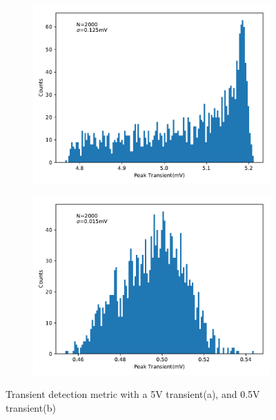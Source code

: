 \begin{figure}[h]
    \centering
    \begin{subfigure}{.5\textwidth}
        \centering
        \includegraphics[width=0.9\linewidth]{img/box_eval/5v_transient_rms.pdf}
        \caption{}
        \label{fig:expdes:4:1}
    \end{subfigure}%
    \begin{subfigure}{.5\textwidth}
        \centering
        \includegraphics[width=0.9\linewidth]{img/box_eval/0p5v_transient_rms.pdf}
        \caption{}
        \label{fig:expdes:4:2}
    \end{subfigure}
    \caption{Transient detection metric with a 5V transient(a), and 0.5V transient(b)}
    \label{fig:expdes:4}
\end{figure}

